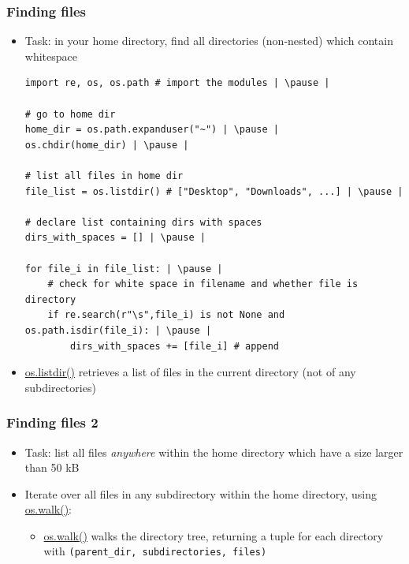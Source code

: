 \documentclass[xcolor=table]{beamer}
\begin{document}
\begin{frame}[fragile]
    \frametitle{Finding files}
    \begin{itemize}
        \item Task: in your home directory, find all directories (non-nested) which contain whitespace
\begin{lstlisting}[style=python]
import re, os, os.path # import the modules | \pause |

# go to home dir
home_dir = os.path.expanduser("~") | \pause |
os.chdir(home_dir) | \pause |

# list all files in home dir
file_list = os.listdir() # ["Desktop", "Downloads", ...] | \pause |

# declare list containing dirs with spaces
dirs_with_spaces = [] | \pause |

for file_i in file_list: | \pause |
    # check for white space in filename and whether file is directory
    if re.search(r"\s",file_i) is not None and os.path.isdir(file_i): | \pause |
        dirs_with_spaces += [file_i] # append
\end{lstlisting} \pause
\item \href{https://docs.python.org/3.7/library/os.html#os.listdir}{os.listdir()} retrieves a list of files in the current directory (not of any subdirectories)
    \end{itemize}
\end{frame}


\begin{frame}[fragile]
    \frametitle{Finding files 2}
    \begin{itemize}\addtolength{\itemsep}{1\baselineskip}
        \item Task: list all files \emph{anywhere} within the home directory which have a size larger than 50 kB \pause
        \item Iterate over all files in any subdirectory within the home directory, using \href{https://docs.python.org/3.7/library/os.html#os.walk}{os.walk()}: \pause
    \begin{itemize}
        \item \href{https://docs.python.org/3.7/library/os.html#os.walk}{os.walk()} walks the directory tree, returning a tuple for each directory with \texttt{(parent\_dir, subdirectories, files)}
    \end{itemize}
    \end{itemize}
\end{frame}
\end{document}
